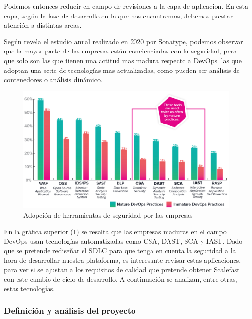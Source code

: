 \documentclass[12pt]{report} %
\begin{document}
Podemos entonces reducir en campo de revisiones a la capa de aplicacion.  En
esta capa, según la fase de desarrollo en la que nos encontremos, debemos
prestar atención a distintas areas.

Según revela el estudio anual \nocite{sonatype2020} realizado en 2020 por
\href{https://sonatype.com}{Sonatype}, podemos observar que la mayor parte de
las empresas están concienciadas con la seguridad, pero que solo son las que
tienen una actitud mas madura respecto a DevOps, las que adoptan una serie de
tecnologías mas actualizadas, como pueden ser análisis de contenedores o
análisis dinámico.

\begin{figure}[H] 
  \includegraphics[width=\textwidth]{sonatype-tools}
  \caption{Adopción de herramientas de seguridad por las empresas}
  \label{fig:sonatype-tools}
\end{figure}

En la gráfica superior (\ref{fig:sonatype-tools}) se resalta que las empresas
maduras en el campo DevOps usan tecnologías automatizadas como \gls{CSA},
\gls{DAST}, \gls{SCA} y \gls{IAST}.  
Dado que se pretende rediseñar el \gls{SDLC} para que tenga en
cuenta la seguridad a la hora de desarrollar nuestra plataforma, es interesante
revisar estas aplicaciones, para ver si se ajustan a los requisitos de calidad
que pretende obtener Scalefast con este cambio de ciclo de desarrollo.
A continuación se analizan, entre otras, estas tecnologías.

\subsubsection{Definición y análisis del proyecto} \label{definicionyanalisis}
\end{document}
